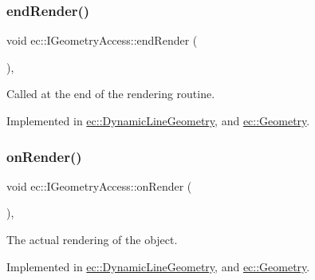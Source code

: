\mbox{\label{classec_1_1_i_geometry_access_a6d3b9c34a8b73aeac26663ef349ce41f}} 
\subsubsection{\texorpdfstring{end\+Render()}{endRender()}}
{\footnotesize\ttfamily void ec\+::\+I\+Geometry\+Access\+::end\+Render (\begin{DoxyParamCaption}{ }\end{DoxyParamCaption})\hspace{0.3cm}{\ttfamily [protected]}, {}}

Called at the end of the rendering routine. 

Implemented in \mbox{\hyperlink{classec_1_1_dynamic_line_geometry_afe9e7118c1c0fc09bd94c72284bfdafd}{ec\+::\+Dynamic\+Line\+Geometry}}, and \mbox{\hyperlink{classec_1_1_geometry_ae0352702162501df185517e84c3b02bd}{ec\+::\+Geometry}}.

\mbox{\label{classec_1_1_i_geometry_access_a2ee418c9fa4eb266347bae2f0ef8095b}} 
\subsubsection{\texorpdfstring{on\+Render()}{onRender()}}
{\footnotesize\ttfamily void ec\+::\+I\+Geometry\+Access\+::on\+Render (\begin{DoxyParamCaption}{ }\end{DoxyParamCaption})\hspace{0.3cm}{\ttfamily [protected]}, {}}

The actual rendering of the object. 

Implemented in \mbox{\hyperlink{classec_1_1_dynamic_line_geometry_ab56984cee973ef2a73ff67339014f0cf}{ec\+::\+Dynamic\+Line\+Geometry}}, and \mbox{\hyperlink{classec_1_1_geometry_a1f166e70fc880e88092f29ef46afb836}{ec\+::\+Geometry}}.

\mbox{\label{classec_1_1_i_geometry_access_a478e674624120a644c05be9be4e386b8}} 
